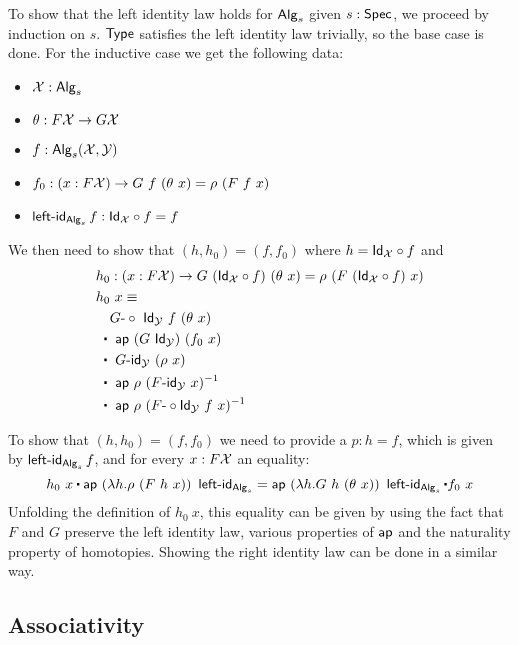 \documentclass[a4paper,10pt]{report}
\begin{document}
To show that the left identity law holds for $\mathsf{Alg}_s$ given
$s : \mathsf{Spec}$, we proceed by induction on $s$. $\mathsf{Type}$ satisfies the left
identity law trivially, so the base case is done. For the inductive
case we get the following data:
%
\begin{itemize}
\item $\mathcal{X} : \mathsf{Alg}_s$
\item $\theta : F \mathcal{X} \to G \mathcal{X}$
\item $f : \mathsf{Alg}_s(\mathcal{X},\mathcal{Y})$ 
\item $f_0 : (x : F \alg{X}) \to G\ f\ (\theta\ x) = \rho\ (F\ f\ x)$
\item $\operatorname{\mathsf{left-id}}_{\mathsf{Alg}_s} f : \mathsf{Id}_{\mathcal{X}} \circ f = f$
\end{itemize}
%
We then need to show that $(h,h_0) = (f,f_0)$ where $h = \mathsf{Id}_{\mathcal{X}} \circ f$ and
\begin{align*}
  &h_0 : (x : F \alg{X}) \to G\ (\Id{\alg{X}} \circ f)\ (\theta\ x) = \rho\ (F\ (\Id{\alg{X}} \circ f)\ x) \\
  &h_0\ x \defeq \\
  &\ \ \    \Gcomp\ \Id{\alg{Y}}\ f\ (\theta\ x) \\
  &\ \ct\ \ap\ (G\ \Id{\alg{Y}})\ (f_0\ x) \\
  &\ \ct\ \Gid_{\alg{Y}}\ (\rho\ x) \\
  &\ \ct\ \ap\ \rho\ (\Fid_{\alg{Y}}\ x)^{-1} \\
  &\ \ct\ \ap\ \rho\ (\Fcomp \Id{\alg{Y}}\ f\ x)^{-1}
\end{align*}

To show that $(h,h_0) = (f,f_0)$ we need to provide a $p : h = f$,
which is given by $\operatorname{\mathsf{left-id}}_{\mathsf{Alg}_s} f$, and for every $x : F \mathcal{X}$ an equality:
$$
h_0\ x \ct \ap\ (\lambda h . \rho\ (F\ h\ x))\ \leftid_{\Alg_s} 
 = \ap\ (\lambda h . G\ h\ (\theta\ x))\ \leftid_{\Alg_s} \ct f_0\ x
$$
Unfolding the definition of $h_0\ x$, this equality can be given by
using the fact that $F$ and $G$ preserve the left identity law,
various properties of $\mathsf{ap}$ and the naturality property of
homotopies. Showing the right identity law can be done in a similar
way.

\subsection{Associativity}
\end{document}
